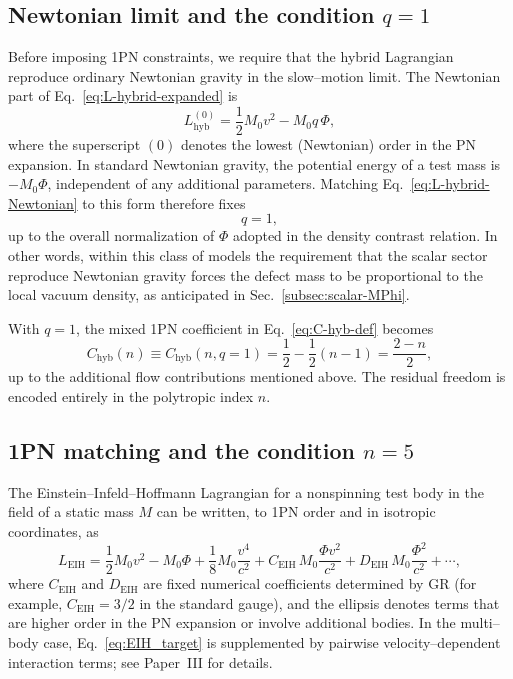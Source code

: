 \documentclass[11pt]{article}
\begin{document}
\subsection{Newtonian limit and the condition \texorpdfstring{$q=1$}{q=1}}
\label{subsec:hybrid-q1}

Before imposing 1PN constraints, we require that the hybrid Lagrangian
reproduce ordinary Newtonian gravity in the slow--motion limit.  The
Newtonian part of Eq.~\eqref{eq:L-hybrid-expanded} is
\begin{equation}
  L_{\text{hyb}}^{(0)}
  = \frac{1}{2} M_0 v^2 - M_0 q\,\Phi,
  \label{eq:L-hybrid-Newtonian}
\end{equation}
where the superscript \((0)\) denotes the lowest (Newtonian) order in the PN
expansion.  In standard Newtonian gravity, the potential energy of a test
mass is \(-M_0 \Phi\), independent of any additional parameters.  Matching
Eq.~\eqref{eq:L-hybrid-Newtonian} to this form therefore fixes
\begin{equation}
  q = 1,
  \label{eq:q-fixed}
\end{equation}
up to the overall normalization of \(\Phi\) adopted in the density contrast
relation.  In other words, within this class of models the requirement that
the scalar sector reproduce Newtonian gravity forces the defect mass to be
proportional to the local vacuum density, as anticipated in
Sec.~\ref{subsec:scalar-MPhi}.

With \(q=1\), the mixed 1PN coefficient in Eq.~\eqref{eq:C-hyb-def} becomes
\begin{equation}
  C_{\text{hyb}}(n)
  \equiv C_{\text{hyb}}(n,q=1)
  = \frac{1}{2} - \frac{1}{2}(n-1)
  = \frac{2 - n}{2},
  \label{eq:C-hyb-q1}
\end{equation}
up to the additional flow contributions mentioned above.  The residual
freedom is encoded entirely in the polytropic index \(n\).

\subsection{1PN matching and the condition \texorpdfstring{$n=5$}{n=5}}
\label{subsec:hybrid-n5}

The Einstein--Infeld--Hoffmann Lagrangian for a nonspinning test body in the
field of a static mass \(M\) can be written, to 1PN order and in isotropic
coordinates, as
\begin{equation}
  L_{\text{EIH}}
  = \frac{1}{2} M_0 v^2 - M_0 \Phi
    + \frac{1}{8} M_0 \frac{v^4}{c^2}
    + C_{\text{EIH}}\,M_0 \frac{\Phi v^2}{c^2}
    + D_{\text{EIH}}\,M_0 \frac{\Phi^2}{c^2}
    + \cdots,
  \label{eq:EIH_target}
\end{equation}
where \(C_{\text{EIH}}\) and \(D_{\text{EIH}}\) are fixed numerical
coefficients determined by GR (for example, \(C_{\text{EIH}} = 3/2\) in the
standard gauge), and the ellipsis denotes terms that are higher order in the
PN expansion or involve additional bodies.  In the multi--body case,
Eq.~\eqref{eq:EIH_target} is supplemented by pairwise velocity--dependent
interaction terms; see Paper~III for details.
\end{document}
